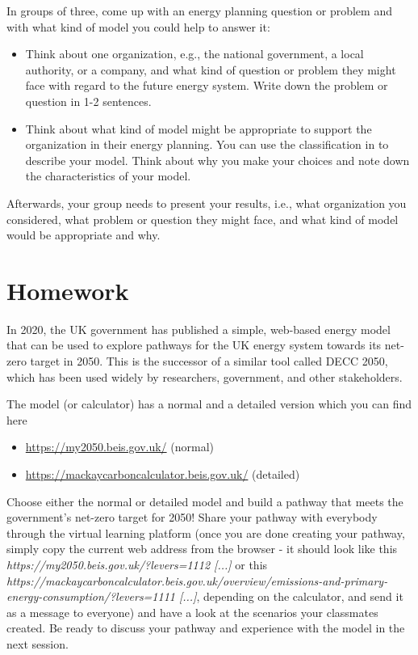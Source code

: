 \begin{kaobox}[frametitle=Task]
In groups of three, come up with an energy planning question or problem and with what kind of model you could help to answer it:
\begin{itemize}
\item Think about one organization, e.g., the national government, a local authority, or a company, and what kind of question or problem they might face with regard to the future energy system. Write down the problem or question in 1-2 sentences.
\item Think about what kind of model might be appropriate to support the organization in their energy planning. You can use the classification in  to describe your model. Think about why you make your choices and note down the characteristics of your model.
\end{itemize}
Afterwards, your group needs to present your results, i.e., what organization you considered, what problem or question they might face, and what kind of model would be appropriate and why.
\end{kaobox}

    
\section{Homework}


In 2020, the UK government has published a simple, web-based energy model that can be used to explore pathways for the UK energy system towards its net-zero target in 2050. This is the successor of a similar tool called DECC 2050, which has been used widely by researchers, government, and other stakeholders.

The model (or calculator) has a normal and a detailed version which you can find here

\begin{itemize}
\item \href{https://my2050.beis.gov.uk/}{https://my2050.beis.gov.uk/} (normal)
\item \href{https://mackaycarboncalculator.beis.gov.uk/}{https://mackaycarboncalculator.beis.gov.uk/} (detailed)
\end{itemize}

Choose either the normal or detailed model and build a pathway that meets the government's net-zero target for 2050! Share your pathway with everybody through the virtual learning platform (once you are done creating your pathway, simply copy the current web address from the browser - it should look like this \textit{https://my2050.beis.gov.uk/?levers=1112 [...]} or this \textit{https://mackaycarboncalculator.beis.gov.uk/overview/emissions-and-primary-energy-consumption/?levers=1111 [...]}, depending on the calculator, and send it as a message to everyone) and have a look at the scenarios your classmates created. Be ready to discuss  your pathway and experience with the model in the next session.